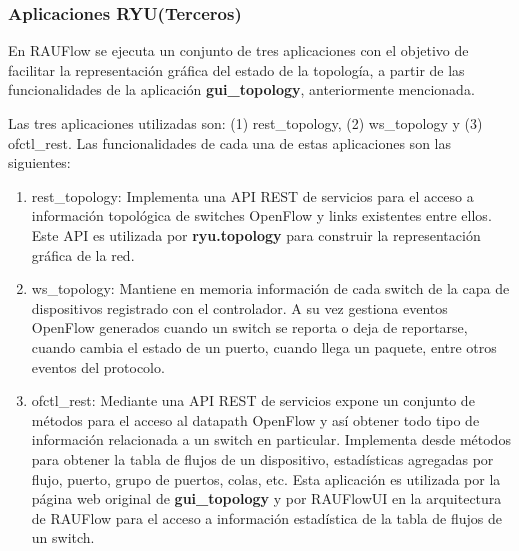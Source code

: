 
\subsubsection{Aplicaciones RYU(Terceros)}
En RAUFlow se ejecuta un conjunto de tres aplicaciones con el objetivo de facilitar la representaci\'on gr\'afica del estado de la topolog\'ia, a partir de las funcionalidades de la aplicación \textbf{gui\_topology}, anteriormente mencionada. 

Las tres aplicaciones utilizadas son:
(1) rest\_topology, (2) ws\_topology y (3) ofctl\_rest. Las funcionalidades de cada una de estas aplicaciones son las siguientes:

\begin{enumerate}
\item rest\_topology: Implementa una API REST de servicios para el acceso a informaci\'on topol\'ogica de switches OpenFlow y links existentes entre ellos. Este API es utilizada por \textbf{ryu.topology} para construir la representaci\'on gr\'afica de la red.

\item ws\_topology: Mantiene en memoria informaci\'on de cada switch de la capa de dispositivos registrado con el controlador. A su vez gestiona eventos OpenFlow generados cuando un switch se reporta o deja de reportarse, cuando cambia el estado de un puerto, cuando llega un paquete, entre otros eventos del protocolo.

\item ofctl\_rest: Mediante una API REST de servicios expone un conjunto de m\'etodos para el acceso al datapath OpenFlow y as\'i obtener todo tipo de informaci\'on relacionada a un switch en particular. Implementa desde m\'etodos para obtener la tabla de flujos de un dispositivo, estadísticas agregadas por flujo, puerto, grupo de puertos, colas, etc. Esta aplicaci\'on es utilizada por la p\'agina web original de \textbf{gui\_topology} y por RAUFlowUI en la arquitectura de RAUFlow para el acceso a informaci\'on estad\'istica de la tabla de flujos de un switch.

\end{enumerate}

